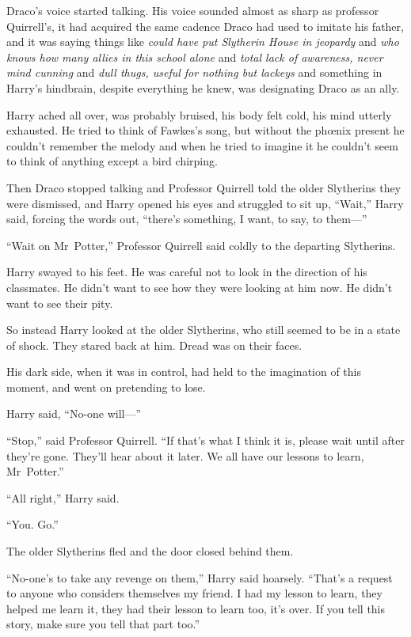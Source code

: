 Draco’s voice started talking. His voice sounded almost as sharp as professor Quirrell’s, it had acquired the same cadence Draco had used to imitate his father, and it was saying things like \emph{could have put Slytherin House in jeopardy} and \emph{who knows how many allies in this school alone} and \emph{total lack of awareness, never mind cunning} and \emph{dull thugs, useful for nothing but lackeys} and something in Harry’s hindbrain, despite everything he knew, was designating Draco as an ally.

Harry ached all over, was probably bruised, his body felt cold, his mind utterly exhausted. He tried to think of Fawkes’s song, but without the phœnix present he couldn’t remember the melody and when he tried to imagine it he couldn’t seem to think of anything except a bird chirping.

Then Draco stopped talking and Professor Quirrell told the older Slytherins they were dismissed, and Harry opened his eyes and struggled to sit up, “Wait,” Harry said, forcing the words out, “there’s something, I want, to say, to them—”

“Wait on Mr~Potter,” Professor Quirrell said coldly to the departing Slytherins.

Harry swayed to his feet. He was careful not to look in the direction of his classmates. He didn’t want to see how they were looking at him now. He didn’t want to see their pity.

So instead Harry looked at the older Slytherins, who still seemed to be in a state of shock. They stared back at him. Dread was on their faces.

His dark side, when it was in control, had held to the imagination of this moment, and went on pretending to lose.

Harry said, “No-one will—”

“Stop,” said Professor Quirrell. “If that’s what I think it is, please wait until after they’re gone. They’ll hear about it later. We all have our lessons to learn, Mr~Potter.”

“All right,” Harry said.

“You. Go.”

The older Slytherins fled and the door closed behind them.

“No-one’s to take any revenge on them,” Harry said hoarsely. “That’s a request to anyone who considers themselves my friend. I had my lesson to learn, they helped me learn it, they had their lesson to learn too, it’s over. If you tell this story, make sure you tell that part too.”

